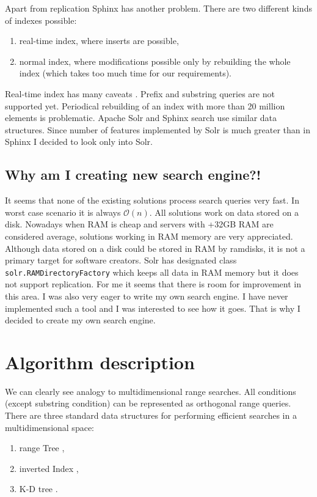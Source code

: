 \documentclass[10pt,a4paper]{article}
\newcommand{\Oh}{\mathcal{O}}
\begin{document}
Apart from replication Sphinx has another problem. There are two different kinds of indexes possible:
\begin{enumerate}
\item real-time index, where inserts are possible,
\item normal index, where modifications possible only by rebuilding the whole index (which takes too much time for our requirements).
\end{enumerate}

Real-time index has many caveats \cite{SPHINXCAV}. Prefix and substring queries are not supported yet. Periodical rebuilding of an index with more than 20 million elements is problematic. Apache Solr and Sphinx search use similar data structures. Since number of features implemented by Solr is much greater than in Sphinx I decided to look only into Solr. 

\subsection{Why am I creating new search engine?!}
It seems that none of the existing solutions process search queries very fast. In worst case scenario it is always $\Oh(n)$. All solutions work on data stored on a disk. Nowadays when RAM is cheap and servers with +32GB RAM are considered average, solutions working in RAM memory are very appreciated. Although data stored on a disk could be stored in RAM by ramdisks, it is not a primary target for software creators. Solr has designated class \verb|solr.RAMDirectoryFactory| which keeps all data in RAM memory but it does not support replication. For me it seems that there is room for improvement in this area. I was also very eager to write my own search engine. I have never implemented such a tool and I was interested to see how it goes. That is why I decided to create my own search engine.  

\section{Algorithm description}
We can clearly see analogy to multidimensional range searches. All conditions (except substring condition) can be represented as orthogonal range queries. There are three standard data structures for performing efficient searches in a multidimensional space:

\begin{enumerate}
\item range Tree \cite{CGAAA},
\item inverted Index \cite{INVIND},
\item K-D tree \cite{CGAAA}.
\end{enumerate}
\end{document}
